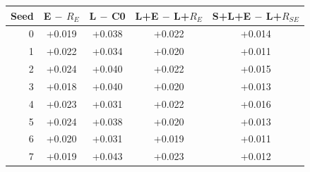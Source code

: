 \begin{tabular}{@{}rcccc@{}}
\toprule
Seed & E $-$ $R_E$ & L $-$ C0 & L+E $-$ L+$R_E$ & S+L+E $-$ L+$R_{SE}$\\
\midrule
0 & +0.019 & +0.038 & +0.022 & +0.014\\
1 & +0.022 & +0.034 & +0.020 & +0.011\\
2 & +0.024 & +0.040 & +0.022 & +0.015\\
3 & +0.018 & +0.040 & +0.020 & +0.013\\
4 & +0.023 & +0.031 & +0.022 & +0.016\\
5 & +0.024 & +0.038 & +0.020 & +0.013\\
6 & +0.020 & +0.031 & +0.019 & +0.011\\
7 & +0.019 & +0.043 & +0.023 & +0.012\\
\bottomrule
\end{tabular}
